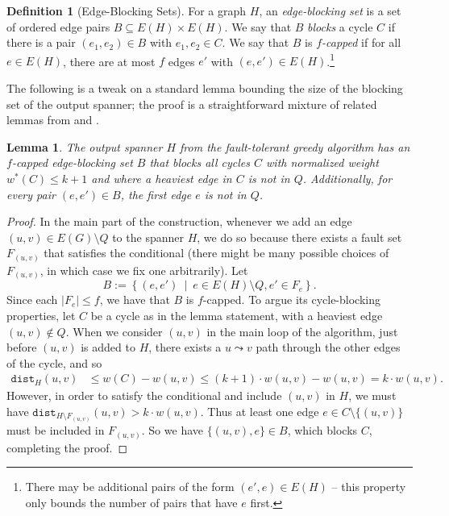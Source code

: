\documentclass{article}
\theoremstyle{plain}
\newtheorem{lemma}[theorem]{Lemma}
\theoremstyle{definition}
\newtheorem{definition}[theorem]{Definition}
\newcommand{\dist}{\texttt{dist}}
\begin{document}
\begin{definition} [Edge-Blocking Sets]
For a graph $H$, an \emph{edge-blocking set} is a set of ordered edge pairs $B \subseteq E(H) \times E(H)$.
We say that $B$ \emph{blocks} a cycle $C$ if there is a pair $(e_1, e_2) \in B$ with $e_1, e_2 \in C$.
We say that $B$ is \emph{$f$-capped} if for all $e \in E(H)$, there are at most $f$ edges $e'$ with $(e, e') \in E(H)$.\footnote{There may be additional pairs of the form $(e', e) \in E(H)$ -- this property only bounds the number of pairs that have $e$ first.}
\end{definition}

The following is a tweak on a standard lemma bounding the size of the blocking set of the output spanner; the proof is a straightforward mixture of related lemmas from \cite{BP19} and \cite{ENS14}.

\begin{lemma} \label{lem:bsetexists}
The output spanner $H$ from the fault-tolerant greedy algorithm has an $f$-capped edge-blocking set $B$ that blocks all cycles $C$ with normalized weight $w^*(C) \le k+1$ and where a heaviest edge in $C$ is not in $Q$.
Additionally, for every pair $(e, e') \in B$, the first edge $e$ is not in $Q$.
\end{lemma}
\begin{proof}
In the main part of the construction, whenever we add an edge $(u, v) \in E(G) \setminus Q$ to the spanner $H$, we do so because there exists a fault set $F_{(u, v)}$ that satisfies the conditional (there might be many possible choices of $F_{(u, v)}$, in which case we fix one arbitrarily).
Let
$$B := \left\{ (e, e') \ \mid \ e \in E(H) \setminus Q, e' \in F_e\right\}.$$
Since each $|F_e| \le f$, we have that $B$ is $f$-capped.
To argue its cycle-blocking properties, let $C$ be a cycle as in the lemma statement, with a heaviest edge $(u, v) \notin Q$.
When we consider $(u, v)$ in the main loop of the algorithm, just before $(u, v)$ is added to $H$, there exists a $u \leadsto v$ path through the other edges of the cycle, and so
\begin{align*}
\dist_H(u, v) &\le w(C) - w(u, v) \le (k+1) \cdot w(u, v) - w(u, v) = k \cdot w(u, v).
\end{align*}
However, in order to satisfy the conditional and include $(u, v)$ in $H$, we must have
$\dist_{H \setminus F_{(u, v)}}(u, v) > k \cdot w(u, v)$.
Thus at least one edge $e \in C \setminus \{(u, v)\}$ must be included in $F_{(u, v)}$.
So we have $\{(u, v), e\} \in B$, which blocks $C$, completing the proof.
\end{proof}
\end{document}
